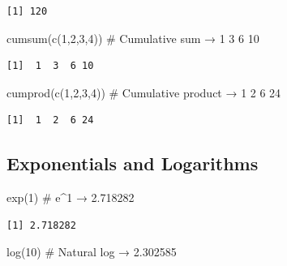 \documentclass[
  letterpaper,
  DIV=11,
  numbers=noendperiod]{scrreprt}
\newenvironment{Shaded}{\begin{snugshade}}{\end{snugshade}}
\newcommand{\CommentTok}[1]{\textcolor[rgb]{0.37,0.37,0.37}{#1}}
\newcommand{\DecValTok}[1]{\textcolor[rgb]{0.68,0.00,0.00}{#1}}
\newcommand{\FunctionTok}[1]{\textcolor[rgb]{0.28,0.35,0.67}{#1}}
\newcommand{\NormalTok}[1]{\textcolor[rgb]{0.00,0.23,0.31}{#1}}
\begin{document}
\begin{verbatim}
[1] 120
\end{verbatim}

\begin{Shaded}
\begin{Highlighting}[]
\FunctionTok{cumsum}\NormalTok{(}\FunctionTok{c}\NormalTok{(}\DecValTok{1}\NormalTok{,}\DecValTok{2}\NormalTok{,}\DecValTok{3}\NormalTok{,}\DecValTok{4}\NormalTok{))     }\CommentTok{\# Cumulative sum → 1 3 6 10}
\end{Highlighting}
\end{Shaded}

\begin{verbatim}
[1]  1  3  6 10
\end{verbatim}

\begin{Shaded}
\begin{Highlighting}[]
\FunctionTok{cumprod}\NormalTok{(}\FunctionTok{c}\NormalTok{(}\DecValTok{1}\NormalTok{,}\DecValTok{2}\NormalTok{,}\DecValTok{3}\NormalTok{,}\DecValTok{4}\NormalTok{))    }\CommentTok{\# Cumulative product → 1 2 6 24}
\end{Highlighting}
\end{Shaded}

\begin{verbatim}
[1]  1  2  6 24
\end{verbatim}

\subsection{Exponentials and
Logarithms}\label{exponentials-and-logarithms}

\begin{Shaded}
\begin{Highlighting}[]
\FunctionTok{exp}\NormalTok{(}\DecValTok{1}\NormalTok{)                 }\CommentTok{\# e\^{}1 → 2.718282}
\end{Highlighting}
\end{Shaded}

\begin{verbatim}
[1] 2.718282
\end{verbatim}

\begin{Shaded}
\begin{Highlighting}[]
\FunctionTok{log}\NormalTok{(}\DecValTok{10}\NormalTok{)                }\CommentTok{\# Natural log → 2.302585}
\end{Highlighting}
\end{Shaded}
\end{document}
